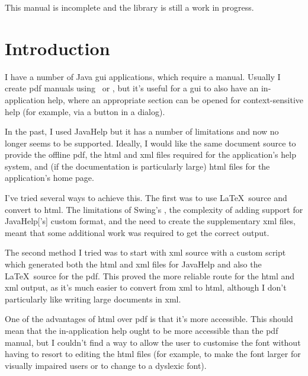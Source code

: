 \documentclass[toc=listof]{scrreport}
\title{\TeXJavaHelp}
\author{Nicola L.C. Talbot\\\href{https://www.dickimaw-books.com/}{\nolinkurl{dickimaw-books.com}}}
\begin{document}
\maketitle

\begin{warning}
This manual is incomplete and the library is still a work in
progress.
\end{warning}

\tableofcontents

\chapter{Introduction}
\label{sec:intro}

I have a number of Java \gls{gui} applications, which require a manual.
Usually I create \gls{pdf} manuals using \pdfLaTeX\ or \LuaLaTeX, but
it's useful for a \gls{gui} to also have an in-application help, where 
an appropriate section can be opened for context-sensitive help (for example,
via a  button in a dialog).

In the past, I used \gls{JavaHelp} but it has a number of limitations and now
no longer seems to be supported. Ideally, I would like the same document source
to provide the offline \gls{pdf}, the \gls{html} and \gls{xml} files required
for the application's help system, and (if the documentation is particularly
large) \gls{html} files for the application's home page.

I've tried several ways to achieve this. The first was to use \LaTeX\ source
and convert to \gls{html}. The limitations of Swing's ,
the complexity of adding support for \gls{JavaHelp}['s] custom
 format, and the need to create the supplementary \gls{xml}
files, meant that some additional work was required to get the correct output.

The second method I tried was to start with \gls{xml} source with a custom
script which generated both the \gls{html} and \gls{xml} files for \gls{JavaHelp}
and also the \LaTeX\ source for the \gls{pdf}. This proved the more reliable route
for the \gls{html} and \gls{xml} output, as it's much easier to convert from \gls{xml}
to \gls{html}, although I don't particularly like writing large documents in 
\gls{xml}.

One of the advantages of \gls{html} over \gls{pdf} is that it's more accessible.
This should mean that the in-application help ought to be more accessible than the
\gls{pdf} manual, but I couldn't find a way to allow the user to customise the
font without having to resort to editing the \gls{html} files (for example, to
make the font larger for visually impaired users or to change to a dyslexic font).
\end{document}
